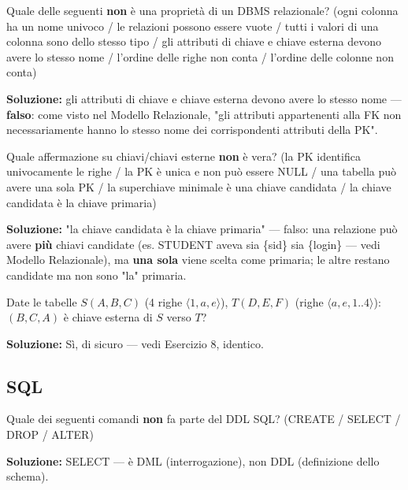 \documentclass[12pt, a4paper]{article}
\begin{document}
\begin{tcolorbox}[colback=lightergray!10, colframe=tocsec, title=\textbf{Esercizio 16}]
Quale delle seguenti \textbf{non} è una proprietà di un DBMS relazionale? (ogni colonna ha un nome univoco / le relazioni possono essere vuote / tutti i valori di una colonna sono dello stesso tipo / gli attributi di chiave e chiave esterna devono avere lo stesso nome / l'ordine delle righe non conta / l'ordine delle colonne non conta)
\end{tcolorbox}
\textbf{Soluzione:} gli attributi di chiave e chiave esterna devono avere lo stesso nome — \textbf{falso}: come visto nel Modello Relazionale, "gli attributi appartenenti alla FK non necessariamente hanno lo stesso nome dei corrispondenti attributi della PK".

\begin{tcolorbox}[colback=lightergray!10, colframe=tocsec, title=\textbf{Esercizio 17}]
Quale affermazione su chiavi/chiavi esterne \textbf{non} è vera? (la PK identifica univocamente le righe / la PK è unica e non può essere NULL / una tabella può avere una sola PK / la superchiave minimale è una chiave candidata / la chiave candidata è la chiave primaria)
\end{tcolorbox}
\textbf{Soluzione:} "la chiave candidata è la chiave primaria" — falso: una relazione può avere \textbf{più} chiavi candidate (es. STUDENT aveva sia \{sid\} sia \{login\} — vedi Modello Relazionale), ma \textbf{una sola} viene scelta come primaria; le altre restano candidate ma non sono "la" primaria.

\begin{tcolorbox}[colback=lightergray!10, colframe=tocsec, title=\textbf{Esercizio 18} (ripetuta identica in entrambi gli appelli)]
Date le tabelle $S(A,B,C)$ (4 righe $\langle1,a,e\rangle$), $T(D,E,F)$ (righe $\langle a,e,1..4\rangle$): $(B,C,A)$ è chiave esterna di $S$ verso $T$? 
\end{tcolorbox}
\textbf{Soluzione:} Sì, di sicuro — vedi Esercizio 8, identico.

\subsection{SQL}

\begin{tcolorbox}[colback=lightergray!10, colframe=tocsec, title=\textbf{Esercizio 19}]
Quale dei seguenti comandi \textbf{non} fa parte del DDL SQL? (CREATE / SELECT / DROP / ALTER)
\end{tcolorbox}
\textbf{Soluzione:} SELECT — è DML (interrogazione), non DDL (definizione dello schema).
\end{document}
